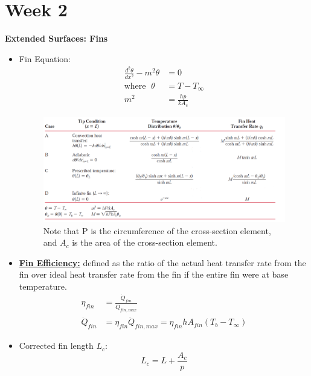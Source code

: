 \section{Week 2}
\textbf{\large Extended Surfaces: Fins}
\begin{itemize}
    \item Fin Equation:
    \begin{align*}
        \frac{d^2\theta}{dx^2} - m^2 \theta &= 0 \\
        \text{where } \; \theta &= T - T_{\infty} \\
        m^2 &= \frac{hp}{k A_c}
    \end{align*}
    \begin{figure}[H]
        \centering
        \includegraphics[width=1.0\linewidth]{images/Fin_equations.png}
        \caption{Note that P is the circumference of the cross-section element, and $A_c$ is the area of the cross-section element.}
    \end{figure}
    \item \textbf{\underline{Fin Efficiency:}} defined as the ratio of \color{red} the actual heat transfer rate from the fin \color{black} over \color{blue} ideal heat transfer rate from the fin if the entire fin were at base temperature. \color{black} 
    \begin{align*}
        \eta_{fin} &= \frac{\dot{Q}_{fin}}{\dot{Q}_{fin,max}} \\
        \dot{Q}_{fin} &= \eta_{fin} \dot{Q}_{fin,max} = \eta_{fin}h A_{fin} (T_b - T_{\infty})
    \end{align*}
    \item Corrected fin length $L_c$:
    \begin{equation*}
        L_c = L + \frac{A_c}{p}
    \end{equation*}
    \begin{figure}[H]
        \centering

\end{figure}
\end{itemize}
